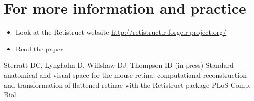 \documentclass{article}
\begin{document}


\section{For more information and practice}
\label{retistruct-tutorial:sec:more-inform-pract}

\begin{itemize}
\item Look at the Retistruct website \url{http://retistruct.r-forge.r-project.org/}
\item Read the paper \cite{SterrattEtal2012}
\end{itemize}

\begin{thebibliography}{99}
Sterratt DC, Lyngholm D, Willshaw DJ, Thompson ID (in press) Standard anatomical and visual space for the mouse retina:
computational reconstruction and transformation of flattened
retinae with the Retistruct package
\newblock PLoS Comp. Biol.
\end{thebibliography}
\end{document}
